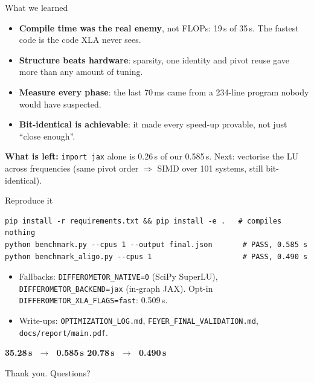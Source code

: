 \documentclass[aspectratio=169,11pt]{beamer}
\newcommand{\hl}[1]{\textcolor{accent}{\textbf{#1}}}
\begin{document}
\begin{frame}{What we learned}
  \begin{itemize}
    \item \hl{Compile time was the real enemy}, not FLOPs: 19\,s of 35\,s. The fastest code is the code XLA never sees.
    \item \hl{Structure beats hardware}: sparsity, one identity and pivot reuse gave more than any amount of tuning.
    \item \hl{Measure every phase}: the last 70\,ms came from a 234-line program nobody would have suspected.
    \item \hl{Bit-identical is achievable}: it made every speed-up provable, not just ``close enough''.
  \end{itemize}
  \vspace{0.8em}
  \textbf{What is left:} \texttt{import jax} alone is 0.26\,s of our 0.585\,s. Next: vectorise the LU across frequencies (same pivot order $\Rightarrow$ SIMD over 101 systems, still bit-identical).
\end{frame}

\begin{frame}[fragile]{Reproduce it}
\begin{verbatim}
pip install -r requirements.txt && pip install -e .   # compiles nothing
python benchmark.py --cpus 1 --output final.json       # PASS, 0.585 s
python benchmark_aligo.py --cpus 1                     # PASS, 0.490 s
\end{verbatim}
  \vspace{0.4em}
  \begin{itemize}
    \item Fallbacks: \texttt{DIFFEROMETOR\_NATIVE=0} (SciPy SuperLU), \texttt{DIFFEROMETOR\_BACKEND=jax} (in-graph JAX). Opt-in \texttt{DIFFEROMETOR\_XLA\_FLAGS=fast}: 0.509\,s.
    \item Write-ups: \texttt{OPTIMIZATION\_LOG.md}, \texttt{FEYER\_FINAL\_VALIDATION.md}, \texttt{docs/report/main.pdf}.
  \end{itemize}
  \vspace{1.2em}
  \centering
  {\Large\bfseries 35.28\,s $\;\longrightarrow\;$ \textcolor{accent}{0.585\,s}  20.78\,s $\;\longrightarrow\;$ \textcolor{accent}{0.490\,s}}\par\vspace{0.3em}
  {\color{muted}Thank you. Questions?}\par
\end{frame}
\end{document}
